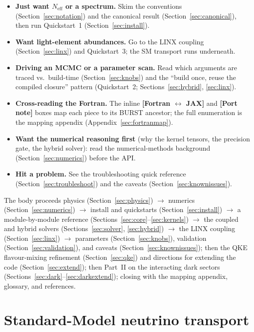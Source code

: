 \documentclass[11pt]{article}
\newcommand{\Neff}{N_{\mathrm{eff}}}
\begin{document}
\begin{itemize}[nosep]
\item \textbf{Just want $\Neff$ or a spectrum.}  Skim the conventions
  (Section~\ref{sec:notation}) and the canonical result
  (Section~\ref{sec:canonical}), then run Quickstart~1 (Section~\ref{sec:install}).
\item \textbf{Want light-element abundances.}  Go to the LINX coupling
  (Section~\ref{sec:linx}) and Quickstart~3; the SM transport runs underneath.
\item \textbf{Driving an MCMC or a parameter scan.}  Read which arguments are
  traced vs.\ build-time (Section~\ref{sec:knobs}) and the ``build once, reuse the
  compiled closure'' pattern (Quickstart~2;
  Sections~\ref{sec:hybrid}, \ref{sec:linx}).
\item \textbf{Cross-reading the Fortran.}  The inline
  \textbf{[Fortran $\leftrightarrow$ JAX]} and \textbf{[Port note]} boxes map each
  piece to its BURST ancestor; the full enumeration is the mapping appendix
  (Appendix~\ref{sec:fortranmap}).
\item \textbf{Want the numerical reasoning first} (why the kernel tensors, the
  precision gate, the hybrid solver): read the numerical-methods background
  (Section~\ref{sec:numerics}) before the API.
\item \textbf{Hit a problem.}  See the troubleshooting quick reference
  (Section~\ref{sec:troubleshoot}) and the caveats
  (Section~\ref{sec:knownissues}).
\end{itemize}

The body proceeds physics (Section~\ref{sec:physics}) $\to$ numerics
(Section~\ref{sec:numerics}) $\to$ install and quickstarts
(Section~\ref{sec:install}) $\to$ a module-by-module reference
(Sections~\ref{sec:core}--\ref{sec:kernels}) $\to$ the coupled and hybrid solvers
(Sections~\ref{sec:solver}, \ref{sec:hybrid}) $\to$ the LINX coupling
(Section~\ref{sec:linx}) $\to$ parameters (Section~\ref{sec:knobs}), validation
(Section~\ref{sec:validation}), and caveats (Section~\ref{sec:knownissues}); then
the QKE flavour-mixing refinement (Section~\ref{sec:qke})
and directions for extending the code (Section~\ref{sec:extend}); then Part~II on the
interacting dark sectors (Sections~\ref{sec:dark}--\ref{sec:darkextend}); closing with
the mapping appendix, glossary, and references.

\part{Standard-Model neutrino transport}
\end{document}
